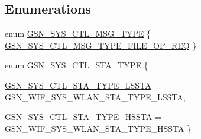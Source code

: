 \subsection*{Enumerations}
\begin{DoxyCompactItemize}
\item 
enum \hyperlink{a00592_a9db34a7470eae0600850f44d6d4101bb}{GSN\_\-SYS\_\-CTL\_\-MSG\_\-TYPE} \{ \hyperlink{a00592_a9db34a7470eae0600850f44d6d4101bba813f1a2677354f48150de5a64dbe9920}{GSN\_\-SYS\_\-CTL\_\-MSG\_\-TYPE\_\-FILE\_\-OP\_\-REQ}
 \}
\item 
enum \hyperlink{a00592_a849d3be20e6f5d436ec1cbbede9ed181}{GSN\_\-SYS\_\-CTL\_\-STA\_\-TYPE} \{ \par
\hyperlink{a00592_a849d3be20e6f5d436ec1cbbede9ed181ac8f00ab936d72cdac6a05a5119e11bf4}{GSN\_\-SYS\_\-CTL\_\-STA\_\-TYPE\_\-LSSTA} =  GSN\_\-WIF\_\-SYS\_\-WLAN\_\-STA\_\-TYPE\_\-LSSTA, 
\par
\hyperlink{a00592_a849d3be20e6f5d436ec1cbbede9ed181afa4edbc937678d4baa28e9046ee05119}{GSN\_\-SYS\_\-CTL\_\-STA\_\-TYPE\_\-HSSTA} =  GSN\_\-WIF\_\-SYS\_\-WLAN\_\-STA\_\-TYPE\_\-HSSTA
 \}
\end{DoxyCompactItemize}
